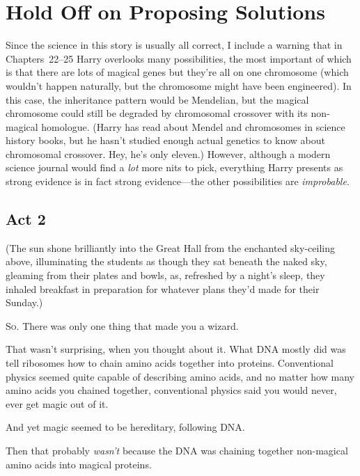 \chapter{Hold Off on Proposing Solutions}

\begin{chapterOpeningAuthorNote}
Since the science in this story is usually all correct, I include a warning that in Chapters~22--25 Harry overlooks many possibilities, the most important of which is that there are lots of magical genes but they're all on one chromosome (which wouldn't happen naturally, but the chromosome might have been engineered). In this case, the inheritance pattern would be Mendelian, but the magical chromosome could still be degraded by chromosomal crossover with its non-magical homologue. (Harry has read about Mendel and chromosomes in science history books, but he hasn't studied enough actual genetics to know about chromosomal crossover. Hey, he's only eleven.) However, although a modern science journal would find a \emph{lot} more nits to pick, everything Harry presents as strong evidence is in fact strong evidence—the other possibilities are \emph{improbable}.
\end{chapterOpeningAuthorNote}

\section{Act 2}

(The sun shone brilliantly into the Great Hall from the enchanted sky-ceiling above, illuminating the students as though they sat beneath the naked sky, gleaming from their plates and bowls, as, refreshed by a night's sleep, they inhaled breakfast in preparation for whatever plans they'd made for their Sunday.)

\lettrine{S}{o.} There was only one thing that made you a wizard.

That wasn't surprising, when you thought about it. What DNA mostly did was tell ribosomes how to chain amino acids together into proteins. Conventional physics seemed quite capable of describing amino acids, and no matter how many amino acids you chained together, conventional physics said you would never, ever get magic out of it.

And yet magic seemed to be hereditary, following DNA.

Then that probably \emph{wasn't} because the DNA was chaining together non-magical amino acids into magical proteins.

